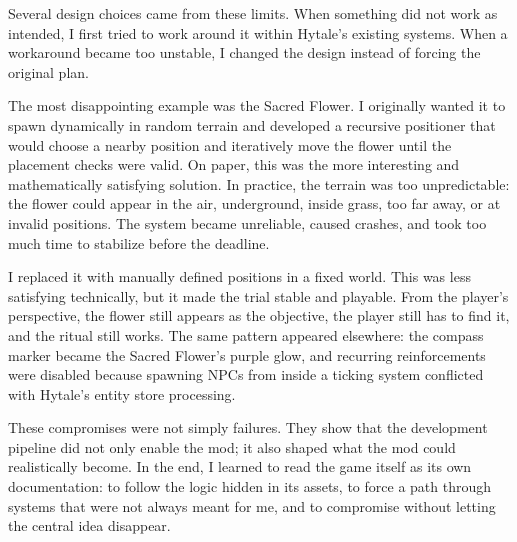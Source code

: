 Several design choices came from these limits.
When something did not work as intended,
I first tried to work around it within Hytale's existing systems.
When a workaround became too unstable,
I changed the design instead of forcing the original plan.

The most disappointing example was the Sacred Flower.
I originally wanted it to spawn dynamically in random terrain
and developed a recursive positioner that would choose a nearby position
and iteratively move the flower until the placement checks were valid.
On paper,
this was the more interesting and mathematically satisfying solution.
In practice,
the terrain was too unpredictable:
the flower could appear in the air,
underground,
inside grass,
too far away,
or at invalid positions.
The system became unreliable,
caused crashes,
and took too much time to stabilize before the deadline.

I replaced it with manually defined positions in a fixed world.
This was less satisfying technically,
but it made the trial stable and playable.
From the player's perspective,
the flower still appears as the objective,
the player still has to find it,
and the ritual still works.
The same pattern appeared elsewhere:
the compass marker became the Sacred Flower's purple glow,
and recurring reinforcements were disabled because spawning NPCs from inside
a ticking system conflicted with Hytale's entity store processing.

These compromises were not simply failures.
They show that the development pipeline did not only enable the mod;
it also shaped what the mod could realistically become.
In the end,
I learned to read the game itself as its own documentation:
to follow the logic hidden in its assets,
to force a path through systems that were not always meant for me,
and to compromise without letting the central idea disappear.